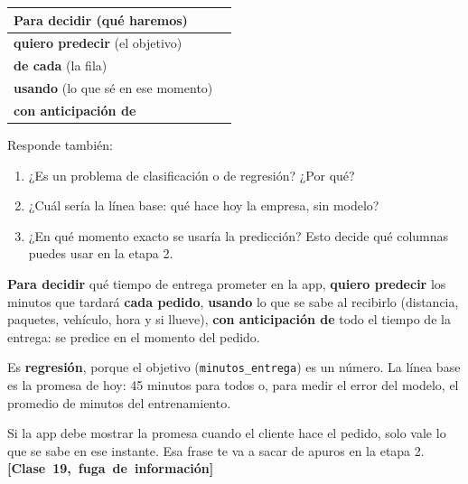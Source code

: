 \documentclass[11pt]{article}
\newcommand{\vez}[1]{\leavevmode\mbox{\color{esumerTeal}\textbf{[#1]}}}
\begin{document}
\renewcommand{\arraystretch}{2.0}
\begin{tabularx}{\textwidth}{@{}>{\raggedright\arraybackslash}p{4.2cm} >{\raggedright\arraybackslash}X@{}}
\toprule
\textbf{Para decidir} (qué haremos) & \\ \hline
\textbf{quiero predecir} (el objetivo) & \\ \hline
\textbf{de cada} (la fila) & \\ \hline
\textbf{usando} (lo que sé en ese momento) & \\ \hline
\textbf{con anticipación de} & \\
\bottomrule
\end{tabularx}\par
\renewcommand{\arraystretch}{1.0}

\vspace{4pt}
Responde también:

\begin{enumerate}[itemsep=2pt, topsep=2pt]
  \item ¿Es un problema de clasificación o de regresión? ¿Por qué?
  \item ¿Cuál sería la línea base: qué hace hoy la empresa, sin modelo?
  \item ¿En qué momento exacto se usaría la predicción? Esto decide qué
    columnas puedes usar en la etapa 2.
\end{enumerate}

\begin{control}
\small \textbf{Para decidir} qué tiempo de entrega prometer en la app,
\textbf{quiero predecir} los minutos que tardará \textbf{cada pedido},
\textbf{usando} lo que se sabe al recibirlo (distancia, paquetes,
vehículo, hora y si llueve), \textbf{con anticipación de} todo el tiempo
de la entrega: se predice en el momento del pedido.

Es \textbf{regresión}, porque el objetivo (\texttt{minutos\_entrega}) es un
número. La línea base es la promesa de hoy: 45 minutos para todos o, para
medir el error del modelo, el promedio de minutos del entrenamiento.
\end{control}

\begin{cuidado}
\small Si la app debe mostrar la promesa cuando el cliente hace el pedido,
solo vale lo que se sabe en ese instante. Esa frase te va a sacar de apuros
en la etapa 2. \vez{Clase 19, fuga de información}
\end{cuidado}
\end{document}
